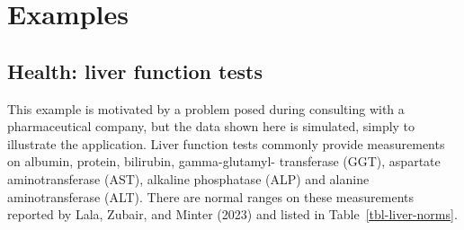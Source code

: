 \documentclass[
  12pt,
]{interact}
\begin{document}
\section{Examples}\label{sec-examples}

\subsection{Health: liver function
tests}\label{health-liver-function-tests}

This example is motivated by a problem posed during consulting with a
pharmaceutical company, but the data shown here is simulated, simply to
illustrate the application. Liver function tests commonly provide
measurements on albumin, protein, bilirubin, gamma-glutamyl- transferase
(GGT), aspartate aminotransferase (AST), alkaline phosphatase (ALP) and
alanine aminotransferase (ALT). There are normal ranges on these
measurements reported by Lala, Zubair, and Minter (2023) and listed in
Table~\ref{tbl-liver-norms}.
\end{document}
